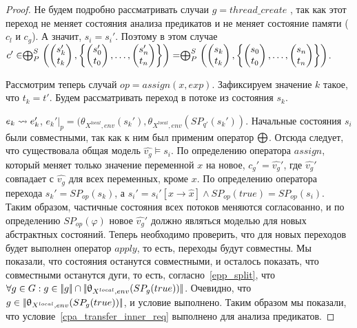 \begin{proof}
Не будем подробно рассматривать случаи $g = thread\_create$
, так как этот переход не меняет состояния анализа предикатов и не меняет состояние памяти ($c_l$ и $c_g$).
А значит, $s_i = s_i'$.
Поэтому в этом случае $c' \in \mathrel{\bigoplus}^S_P
\left(
\begin{pmatrix}
s_k' \\
t_k 
\end{pmatrix},
\left\{
\begin{pmatrix}
s_0' \\
t_0 
\end{pmatrix},
\dots ,
\begin{pmatrix}
s_n' \\
t_n 
\end{pmatrix}
\right\}
\right) = 
\mathrel{\bigoplus}^S_P
\left(
\begin{pmatrix}
s_k \\
t_k 
\end{pmatrix},
\left\{
\begin{pmatrix}
s_0 \\
t_0 
\end{pmatrix},
\dots ,
\begin{pmatrix}
s_n \\
t_n 
\end{pmatrix}
\right\}
\right)$.

Рассмотрим теперь случай $op = assign(x, exp)$. Зафиксируем значение $k$ такое, что $t_k = t'$. Будем рассматривать переход в потоке из состояния $s_k$.

$e_k \leadsto e_k'$, $e_k'|_p = (\theta_{X^{local},env}(s_k'),\theta_{X^{local},env}(SP_{q'}(s_k'))$. 
Начальные состояния $s_i$ были совместными, так как к ним был применим оператор $\mathrel{\bigoplus}$. 
Отсюда следует, что существовала общая модель $\hat{v_g} \models s_i$.
По определению оператора $assign$, который меняет только значение переменной $x$ на новое, $c_g' = \hat{v_g}'$, где $\hat{v_g}'$ совпадает с $\hat{v_g}$ для всех переменных, кроме $x$.
По определению оператора перехода $s_k' = SP_{op}(s_k)$, а $s_i' = s_i'[x \rightarrow \hat x] \land SP_{op}(true) = SP_{op}(s_i)$.
Таким образом, частичные состояния всех потоков меняются согласованно, и по определению $SP_{op}(\varphi)$ новое $\hat{v_g}'$ должно являться моделью для новых абстрактных состояний.
Теперь необходимо проверить, что для новых переходов будет выполнен оператор $apply$, то есть, переходы будут совместны.
Мы показали, что состояния останутся совместными, и осталось показать, что совместными останутся дуги, то есть, согласно~\ref{epp_split}, что $\forall g \in G: g \in \lvert \! \lvert g \rvert \! \rvert \cap \lvert \! \lvert \uptheta_{X^{local},env}(SP_{g}(true)) \rvert \! \rvert$. 
Очевидно, что $g \in \lvert \! \lvert \uptheta_{X^{local},env}(SP_{g}(true)) \rvert \! \rvert$, и условие выполнено.
Таким образом мы показали, что условие~\ref{cpa_transfer_inner_req} выполнено для анализа предикатов.

\end{proof}


